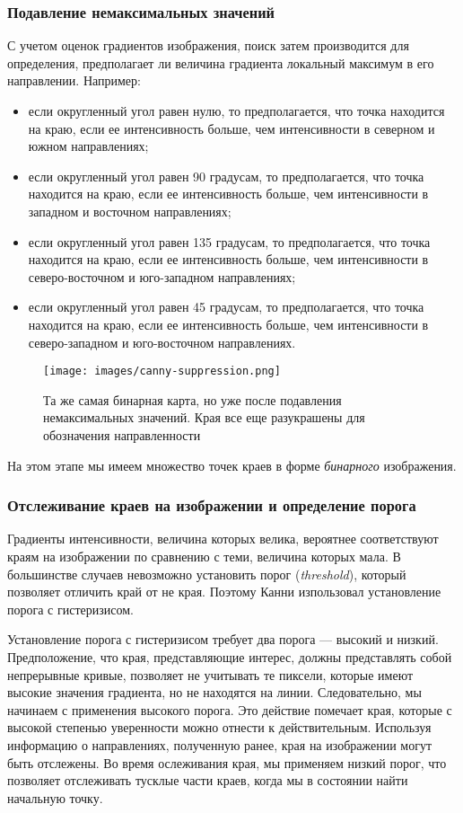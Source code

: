 \subsubsection{Подавление немаксимальных значений}
С учетом оценок градиентов изображения, поиск затем производится для определения, предполагает ли величина градиента локальный максимум в его направлении. Например:
\begin{itemize}
  \item если округленный угол равен нулю, то предполагается, что точка находится на краю, если ее интенсивность больше, чем интенсивности в северном и южном направлениях;
  \item если округленный угол равен 90 градусам, то предполагается, что точка находится на краю, если ее интенсивность больше, чем интенсивности в западном и восточном направлениях;
  \item если округленный угол равен 135 градусам, то предполагается, что точка находится на краю, если ее интенсивность больше, чем интенсивности в северо-восточном и юго-западном направлениях;
  \item если округленный угол равен 45 градусам, то предполагается, что точка находится на краю, если ее интенсивность больше, чем интенсивности в северо-западном и юго-восточном направлениях.
\end{itemize}

\begin{figure}
  \centering
  \texttt{[image: images/canny-suppression.png]}
  \caption{Та же самая бинарная карта, но уже после подавления немаксимальных значений. Края все еще разукрашены для обозначения направленности\label{canny-suppression}}
\end{figure}

На этом этапе мы имеем множество точек краев в форме \emph{бинарного} изображения.

\subsubsection{Отслеживание краев на изображении и определение порога}
Градиенты интенсивности, величина которых велика, вероятнее соответствуют краям на изображении по сравнению с теми, величина которых мала. В большинстве случаев невозможно установить порог (\emph{threshold}), который позволяет отличить край от не края. Поэтому Канни изпользовал установление порога с гистеризисом.

Установление порога с гистеризисом требует два порога --- высокий и низкий. Предположение, что края, представляющие интерес, должны представлять собой непрерывные кривые, позволяет не учитывать те пиксели, которые имеют высокие значения градиента, но не находятся на линии. Следовательно, мы начинаем с применения высокого порога. Это действие помечает края, которые с высокой степенью уверенности можно отнести к действительным. Используя информацию о направлениях, полученную ранее, края на изображении могут быть отслежены. Во время ослеживания края, мы применяем низкий порог, что позволяет отслеживать тусклые части краев, когда мы в состоянии найти начальную точку.

